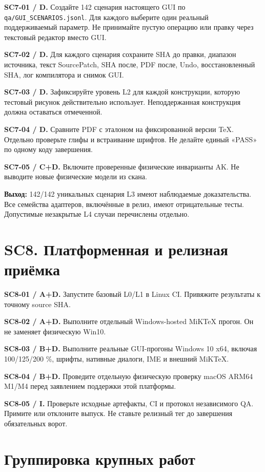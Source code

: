 \documentclass[11pt,a4paper,oneside]{scrreprt}
\begin{document}
\textbf{SC7-01 / D.} Создайте 142 сценария настоящего GUI по \texttt{qa/GUI\_SCENARIOS.jsonl}. Для каждого выберите один реальный поддерживаемый параметр. Не принимайте пустую операцию или правку через текстовый редактор вместо GUI.

\textbf{SC7-02 / D.} Для каждого сценария сохраните SHA до правки, диапазон источника, текст SourcePatch, SHA после, PDF после, Undo, восстановленный SHA, лог компилятора и снимок GUI.

\textbf{SC7-03 / D.} Зафиксируйте уровень L2 для каждой конструкции, которую тестовый рисунок действительно использует. Неподдержанная конструкция должна оставаться отмеченной.

\textbf{SC7-04 / D.} Сравните PDF с эталоном на фиксированной версии TeX. Отдельно проверьте глифы и встраивание шрифтов. Не делайте единый «PASS» по одному коду завершения.

\textbf{SC7-05 / C+D.} Включите проверенные физические инварианты AK. Не выводите новые физические модели из скана.

\textbf{Выход:} 142/142 уникальных сценария L3 имеют наблюдаемые доказательства. Все семейства адаптеров, включённые в релиз, имеют отрицательные тесты. Допустимые незакрытые L4 случаи перечислены отдельно.

\section{SC8. Платформенная и релизная приёмка}\label{sc8.-ux43fux43bux430ux442ux444ux43eux440ux43cux435ux43dux43dux430ux44f-ux438-ux440ux435ux43bux438ux437ux43dux430ux44f-ux43fux440ux438ux451ux43cux43aux430}

\textbf{SC8-01 / A+D.} Запустите базовый L0/L1 в Linux CI. Привяжите результаты к точному source SHA.

\textbf{SC8-02 / A+D.} Выполните отдельный Windows-hosted MiKTeX прогон. Он не заменяет физическую Win10.

\textbf{SC8-03 / B+D.} Выполните реальные GUI-прогоны Windows 10 x64, включая 100/125/200 \%, шрифты, нативные диалоги, IME и внешний MiKTeX.

\textbf{SC8-04 / B+D.} Проведите отдельную физическую проверку macOS ARM64 M1/M4 перед заявлением поддержки этой платформы.

\textbf{SC8-05 / I.} Проверьте исходные артефакты, CI и протокол независимого QA. Примите или отклоните выпуск. Не ставьте релизный тег до завершения обязательных ворот.

\section{Группировка крупных работ}\label{ux433ux440ux443ux43fux43fux438ux440ux43eux432ux43aux430-ux43aux440ux443ux43fux43dux44bux445-ux440ux430ux431ux43eux442}
\end{document}
